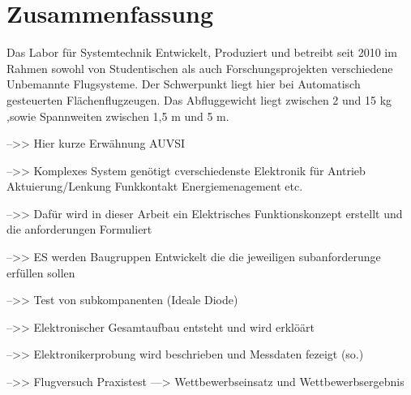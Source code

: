 \chapter*{Zusammenfassung}

Das Labor für Systemtechnik Entwickelt, Produziert und betreibt seit 2010 im Rahmen sowohl von Studentischen als auch Forschungsprojekten verschiedene Unbemannte Flugsysteme.
Der Schwerpunkt liegt hier bei Automatisch gesteuerten Flächenflugzeugen.
Das Abfluggewicht liegt zwischen 2 und 15 kg ,sowie Spannweiten zwischen 1,5 m und 5 m.

-->> Hier kurze Erwähnung AUVSI 

-->> Komplexes System genötigt cverschiedenste Elektronik für Antrieb Aktuierung/Lenkung Funkkontakt Energiemenagement etc.

-->> Dafür wird in dieser Arbeit ein Elektrisches Funktionskonzept erstellt und die anforderungen Formuliert

-->> ES werden Baugruppen Entwickelt die die jeweiligen subanforderunge erfüllen sollen

-->> Test von subkompanenten (Ideale Diode)

-->> Elektronischer Gesamtaufbau entsteht und wird erklöärt

-->> Elektronikerprobung wird beschrieben und Messdaten fezeigt (so.)

-->> Flugversuch Praxistest ---> Wettbewerbseinsatz und Wettbewerbsergebnis

